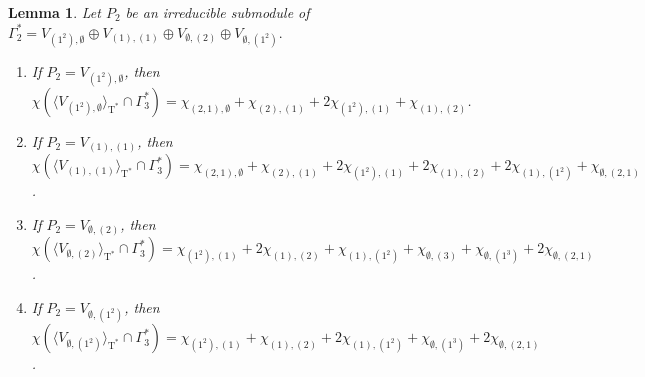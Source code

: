 \documentclass[10pt,a4paper]{amsart}
\newtheorem{lem}{Lemma}
\def \Ga{\Gamma}
\def \T{\operatorname{T}}
\def \es{\emptyset}
\newcommand{\lr}[1]{\langle #1 \rangle}
\begin{document}
\begin{lem}\label{lem2.12}
	Let $P_2$ be an irreducible submodule of $\Ga_2^*= V_{(1^2), \es} \oplus  V_{(1),(1)} \oplus V_{\es,(2)} \oplus V_{\es,(1^2)}.$
	\begin{enumerate}
		\item[(1)]
		If $P_2=V_{(1^2), \es}$, then $\chi({\lr{V_{(1^2), \es}}_{\T^*} \cap \Ga_3^*}) = \chi_{(2,1),\es} +\chi_{(2),(1)} + 2\chi_{(1^2),(1)} + \chi_{(1),(2)}$.
		\item[(2)]
		If $P_2=V_{(1), (1)}$, then $\chi({\lr{V_{(1), (1)}}_{\T^*} \cap \Ga_3^*}) = \chi_{(2,1),\es} + \chi_{(2),(1)} + 2\chi_{(1^2),(1)} + 2\chi_{(1),(2)} + 2\chi_{(1),(1^2)} + \chi_{\es, (2,1)}$.
		\item[(3)]
		If $P_2=V_{\es, (2)}$, then $\chi({\lr{V_{\es, (2)}}_{\T^*} \cap \Ga_3^*}) = \chi_{(1^2),(1)} + 2\chi_{(1),(2)} + \chi_{(1),(1^2)} + \chi_{\es, (3)} + \chi_{\es, (1^3)} + 2\chi_{\es, (2,1)}$.
		\item[(4)]
		If $P_2=V_{\es, (1^2)}$, then $\chi({\lr{V_{\es, (1^2)}}_{\T^*} \cap \Ga_3^*}) = \chi_{(1^2),(1)} + \chi_{(1),(2)} + 2\chi_{(1),(1^2)} + \chi_{\es, (1^3)} + 2\chi_{\es, (2,1)}$.
	\end{enumerate}
\end{lem}	
\end{document}
